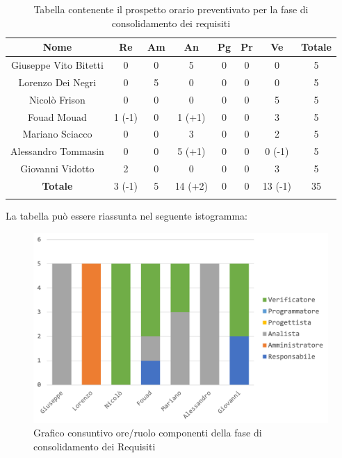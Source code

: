 			\begin{longtable}{|c|c|c|c|c|c|c|c}
				\hline
				\rowcolor{lighter-grayer}
				\textbf{Nome} & \textbf{Re} & \textbf{Am} & \textbf{An} & \textbf{Pg}  & \textbf{Pr}   & \textbf{Ve} & \textbf{Totale} \\
				\hline
				\endfirsthead
				
				\hline
				Giuseppe Vito Bitetti 	& 0 & 0 & 5 & 0 & 0 & 0 & 5\\
				\hline
				\hline
				Lorenzo Dei Negri	 	& 0 & 5 & 0 & 0 & 0 & 0 & 5\\
				\hline
				\hline
				Nicolò Frison			   & 0 & 0 & 0 & 0 & 0 & 5 & 5\\
				\hline
				\hline
				Fouad Mouad 			& 1 (-1) & 0 & 1 (+1) & 0 & 0 & 3 & 5\\
				\hline
				\hline
				Mariano Sciacco		 	& 0 & 0 & 3 & 0 & 0 & 2 & 5\\
				\hline
				\hline
				Alessandro Tommasin & 0 & 0 & 5 (+1) & 0 & 0 & 0 (-1) & 5\\
				\hline
				\hline
				Giovanni Vidotto 		 & 2 & 0 & 0 & 0 & 0 & 3 & 5\\
				\hline 
				\textbf{Totale} 			& 3 (-1) &  5 & 14 (+2) & 0 & 0 & 13 (-1) & 35\\
				\hline
				\caption{Tabella contenente il prospetto orario preventivato per la fase di consolidamento dei requisiti}
			\end{longtable}
			\pagebreak	
			
			La tabella può essere riassunta nel seguente istogramma:
			
			\begin{figure}[H]
				\centering
				\includegraphics[width=0.8\linewidth]{images/consuntivo/ConsReqCons.png}
				\caption{Grafico consuntivo ore/ruolo componenti della fase di consolidamento dei Requisiti}
				\label{fig:consuntivo grafico suddivisione ruoli fase di consolidamento dei requisiti}
			\end{figure}
			
